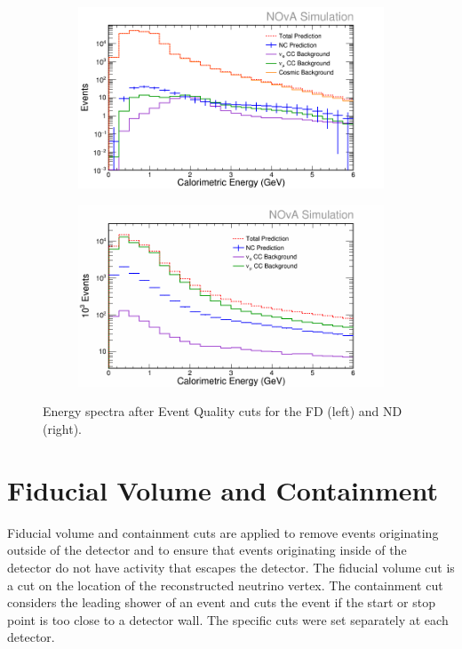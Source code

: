 \begin{figure}[h]
  \centering
  \begin{subfigure}{.48\textwidth}
    \centering
    \includegraphics[width=1\linewidth]{figures/RecoE1FD.png}
  \end{subfigure}
  \begin{subfigure}{.48\textwidth}
    \centering
    \includegraphics[width=1\linewidth]{figures/RecoE1ND.png}
  \end{subfigure}
  \caption[Energy Spectra After Event Quality Cuts]{Energy spectra after Event Quality cuts for the FD (left) and ND (right).}
  \label{fig:NP1EventQual}
\end{figure}

\section{Fiducial Volume and Containment}

Fiducial volume and containment cuts are applied to remove events originating outside of the detector and to ensure that events originating inside of the detector do not have activity that escapes the detector. The fiducial volume cut is a cut on the location of the reconstructed neutrino vertex. The containment cut considers the leading shower of an event and cuts the event if the start or stop point is too close to a detector wall. The specific cuts were set separately at each detector.

